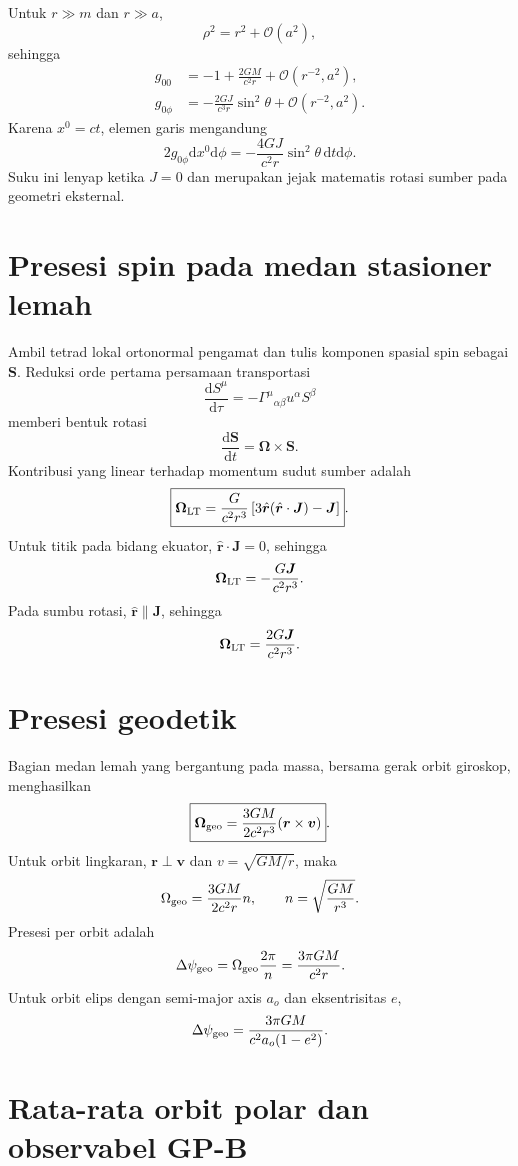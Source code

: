 \documentclass[12pt,a4paper]{report}
\newcommand{\dd}{\mathrm{d}}
\newcommand{\order}{\mathcal{O}}
\begin{document}
Untuk $r\gg m$ dan $r\gg a$,
\[
 \rho^2=r^2+\order(a^2),
\]
sehingga
\begin{align}
 g_{00}&=-1+\frac{2GM}{c^2r}+\order(r^{-2},a^2),\\
 g_{0\phi}&=-\frac{2GJ}{c^3r}\sin^2\theta
 +\order(r^{-2},a^2).
\end{align}
Karena $x^0=ct$, elemen garis mengandung
\[
 2g_{0\phi}\dd x^0\dd\phi
 =-\frac{4GJ}{c^2r}\sin^2\theta\,\dd t\dd\phi.
\]
Suku ini lenyap ketika $J=0$ dan merupakan jejak matematis rotasi sumber pada
geometri eksternal.

\section{Presesi spin pada medan stasioner lemah}

Ambil tetrad lokal ortonormal pengamat dan tulis komponen spasial spin sebagai
$\bm S$. Reduksi orde pertama persamaan transportasi
\[
 \frac{\dd S^\mu}{\dd\tau}
 =-\Gamma^\mu{}_{\alpha\beta}u^\alpha S^\beta
\]
memberi bentuk rotasi
\[
 \frac{\dd\bm S}{\dd t}=\bm\Omega\times\bm S.
\]
Kontribusi yang linear terhadap momentum sudut sumber adalah
\[
 \boxed{
 \bm\Omega_{\rm LT}
 =\frac{G}{c^2r^3}\left[
 3\hat{\bm r}(\hat{\bm r}\cdot\bm J)-\bm J
 \right]}.
\]
Untuk titik pada bidang ekuator, $\hat{\bm r}\cdot\bm J=0$, sehingga
\[
 \bm\Omega_{\rm LT}=-\frac{G\bm J}{c^2r^3}.
\]
Pada sumbu rotasi, $\hat{\bm r}\parallel\bm J$, sehingga
\[
 \bm\Omega_{\rm LT}=\frac{2G\bm J}{c^2r^3}.
\]

\section{Presesi geodetik}

Bagian medan lemah yang bergantung pada massa, bersama gerak orbit giroskop,
menghasilkan
\[
 \boxed{
 \bm\Omega_{\rm geo}
 =\frac{3GM}{2c^2r^3}(\bm r\times\bm v)}.
\]
Untuk orbit lingkaran, $\bm r\perp\bm v$ dan $v=\sqrt{GM/r}$, maka
\[
 \Omega_{\rm geo}
 =\frac{3GM}{2c^2r}n,
 \qquad n=\sqrt{\frac{GM}{r^3}}.
\]
Presesi per orbit adalah
\[
 \Delta\psi_{\rm geo}
 =\Omega_{\rm geo}\frac{2\pi}{n}
 =\frac{3\pi GM}{c^2r}.
\]
Untuk orbit elips dengan semi-major axis $a_o$ dan eksentrisitas $e$,
\[
 \Delta\psi_{\rm geo}
 =\frac{3\pi GM}{c^2a_o(1-e^2)}.
\]

\section{Rata-rata orbit polar dan observabel GP-B}
\end{document}
